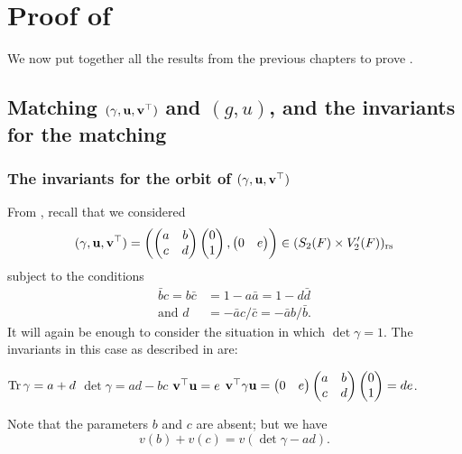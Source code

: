 \chapter{Proof of }
\label{ch:finale}
We now put together all the results from the previous chapters to
prove .

\section{Matching ${(\gamma, \mathbf u, \mathbf v^\top)}$ and $(g,u)$, and the invariants for the matching}
\subsection{The invariants for the orbit of ${(\gamma, \mathbf u, \mathbf v^\top)}$}
From , recall that we considered
\[
  (\gamma, \mathbf u, \mathbf v^\top)
  =
  \left( \begin{pmatrix} a & b \\ c & d \end{pmatrix}
    \begin{pmatrix} 0 \\ 1 \end{pmatrix}, \begin{pmatrix} 0 & e \end{pmatrix} \right)
  \in (S_2(F) \times V'_2(F))_{\mathrm{rs}}
\]
subject to the conditions
\begin{align*}
  \bar b c = b \bar c &= 1 - a \bar a = 1 - d \bar d \\
  \text{and } d &= - \bar a c / \bar c = -\bar a b / \bar b.
\end{align*}
It will again be enough to consider the situation in which $\det \gamma = 1$.
The invariants in this case as described in  are:
\begin{itemize}
  \ii $\operatorname{Tr} \gamma = a + d$
  \ii $\det \gamma = ad - bc$
  \ii $\mathbf v^\top \mathbf u = e$
  \ii $\mathbf v^\top \gamma \mathbf u = \begin{pmatrix} 0 & e \end{pmatrix}
  \begin{pmatrix} a & b \\ c & d \end{pmatrix} \begin{pmatrix} 0 \\ 1 \end{pmatrix} = de$.
\end{itemize}
Note that the parameters $b$ and $c$ are absent; but we have
\[ v(b) + v(c) = v(\det \gamma - a d). \]

